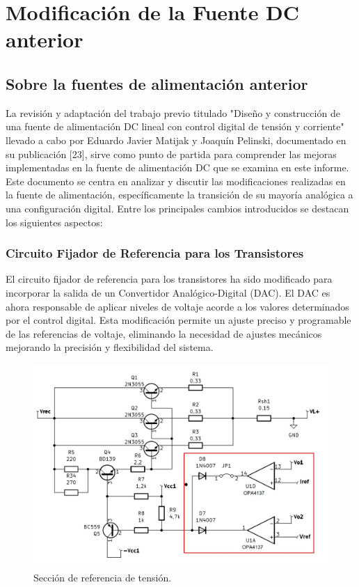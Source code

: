 \chapter{Modificación de la Fuente DC anterior}

\label{C:Sobre la fuente anterior}

\section{Sobre la fuentes de alimentación anterior}
La revisión y adaptación del trabajo previo titulado "Diseño y construcción de una fuente de alimentación DC lineal con control digital de tensión y corriente" llevado a cabo por Eduardo Javier Matijak y Joaquín Pelinski, documentado en su publicación [23], sirve como punto de partida para comprender las mejoras implementadas en la fuente de alimentación DC que se examina en este informe. \cite{Invitamos cordialmente al lector interesado a consultar dicho trabajo para obtener 
una comprensión más completa de los fundamentos sobre los cuales se basa este análisis.}
Este documento se centra en analizar y discutir las modificaciones realizadas en la fuente de alimentación, específicamente la transición de su mayoría analógica a una configuración digital. Entre los principales cambios introducidos se destacan los siguientes aspectos:

\subsection{Circuito Fijador de Referencia para los Transistores}
El circuito fijador de referencia para los transistores ha sido modificado para incorporar la salida de un Convertidor Analógico-Digital (DAC). El DAC es ahora responsable de aplicar niveles de voltaje acorde a los valores determinados por el control digital. Esta modificación permite un ajuste preciso y programable de las referencias de voltaje, eliminando la necesidad de ajustes mecánicos mejorando la precisión y flexibilidad del sistema.
\begin{figure}[H]
    \centering
    \includegraphics[scale=0.3]{./imagenes/Eliminada1.jpg}
    \caption{Sección de referencia de tensión.}
    \label{F:estructura_archivos}
\end{figure}


